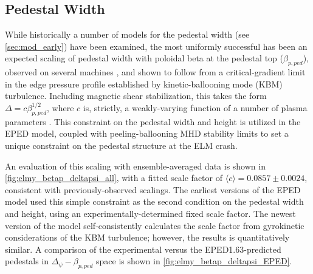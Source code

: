 \subsection{Pedestal Width}\label{subsec:elmy_eped_width}

While historically a number of models for the pedestal width (see \cref{sec:mod_early}) have been examined, the most uniformly successful has been an expected scaling of pedestal width with poloidal beta at the pedestal top ($\beta_{p,ped}$), observed on several machines \cite{Groebner2013}, and shown to follow from a critical-gradient limit in the edge pressure profile established by kinetic-ballooning mode (KBM) turbulence.  Including magnetic shear stabilization, this takes the form $\Delta = c \beta_{p,ped}^{1/2}$, where $c$ is, strictly, a weakly-varying function of a number of plasma parameters \cite{Snyder2009}.  This constraint on the pedestal width and height is utilized in the EPED model, coupled with peeling-ballooning MHD stability limits to set a unique constraint on the pedestal structure at the ELM crash.

An evaluation of this scaling with ensemble-averaged data is shown in \cref{fig:elmy_betap_deltapsi_all}, with a fitted scale factor of $\langle c \rangle = 0.0857 \pm 0.0024$, consistent with previously-observed scalings.  The earliest versions of the EPED model used this simple constraint as the second condition on the pedestal width and height, using an experimentally-determined fixed scale factor.  The newest version of the model self-consistently calculates the scale factor from gyrokinetic considerations of the KBM turbulence; however, the results is quantitatively similar.  A comparison of the experimental versus the EPED1.63-predicted pedestals in $\Delta_\psi - \beta_{p,ped}$ space is shown in \cref{fig:elmy_betap_deltapsi_EPED}.

\begin{figure}[ht]
 \pushtooutside
\end{figure}

